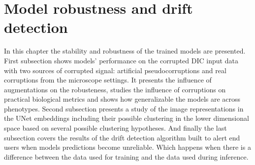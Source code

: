 \section{Model robustness and drift detection}
    In this chapter the stability and robustness of the trained models are presented. First subsection shows models' performance on the corrupted DIC input data with two sources of corrupted signal: artificial pseudocorruptions and real corruptions from the microscope settings. It presents the influence of augmentations on the robusteness, studies the influence of corruptions on practical biological metrics and shows how generalizable the models are across phenotypes. Second subsection presents a study of the image representations in the UNet embeddings including their possible clustering in the lower dimensional space based on several possible clustering hypotheses. And finally the last subsection covers the results of the drift detection algorithm built to alert end users when models predictions become unreliable. Which happens when there is a difference between the data used for training and the data used during inference. 
    
    
    
